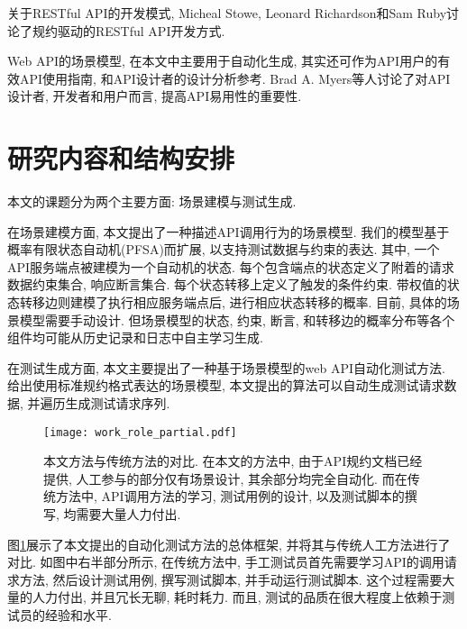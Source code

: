     	关于RESTful API的开发模式, Micheal Stowe\cite{michaels15}, Leonard Richardson和Sam Ruby\cite{leonardr07}讨论了规约驱动的RESTful API开发方式.
    	
    	Web API的场景模型, 在本文中主要用于自动化生成, 其实还可作为API用户的有效API使用指南, 和API设计者的设计分析参考. Brad A. Myers等人\cite{bradm17}讨论了对API设计者, 开发者和用户而言, 提高API易用性的重要性.

	\section{研究内容和结构安排}
	
	    本文的课题分为两个主要方面: 场景建模与测试生成.
	
	    在场景建模方面, 本文提出了一种描述API调用行为的场景模型. 我们的模型基于概率有限状态自动机(PFSA)而扩展, 以支持测试数据与约束的表达. 其中, 一个API服务端点被建模为一个自动机的状态. 每个包含端点的状态定义了附着的请求数据约束集合, 响应断言集合. 每个状态转移上定义了触发的条件约束. 带权值的状态转移边则建模了执行相应服务端点后, 进行相应状态转移的概率. 目前, 具体的场景模型需要手动设计. 但场景模型的状态, 约束, 断言, 和转移边的概率分布等各个组件均可能从历史记录和日志中自主学习生成.
	
        在测试生成方面, 本文主要提出了一种基于场景模型的web API自动化测试方法. 给出使用标准规约格式表达的场景模型, 本文提出的算法可以自动生成测试请求数据, 并遍历生成测试请求序列.
        
        \begin{figure}[!htb]
            \centering
            \texttt{[image: work\_role\_partial.pdf]}
            \caption{本文方法与传统方法的对比. 在本文的方法中, 由于API规约文档已经提供, 人工参与的部分仅有场景设计, 其余部分均完全自动化. 而在传统方法中, API调用方法的学习, 测试用例的设计, 以及测试脚本的撰写, 均需要大量人力付出.}
            \label{fig:overview}
        \end{figure}
        
        图\ref{fig:overview}展示了本文提出的自动化测试方法的总体框架, 并将其与传统人工方法进行了对比. 如图中右半部分所示, 在传统方法中, 手工测试员首先需要学习API的调用请求方法, 然后设计测试用例, 撰写测试脚本, 并手动运行测试脚本. 这个过程需要大量的人力付出, 并且冗长无聊, 耗时耗力. 而且, 测试的品质在很大程度上依赖于测试员的经验和水平.
        
